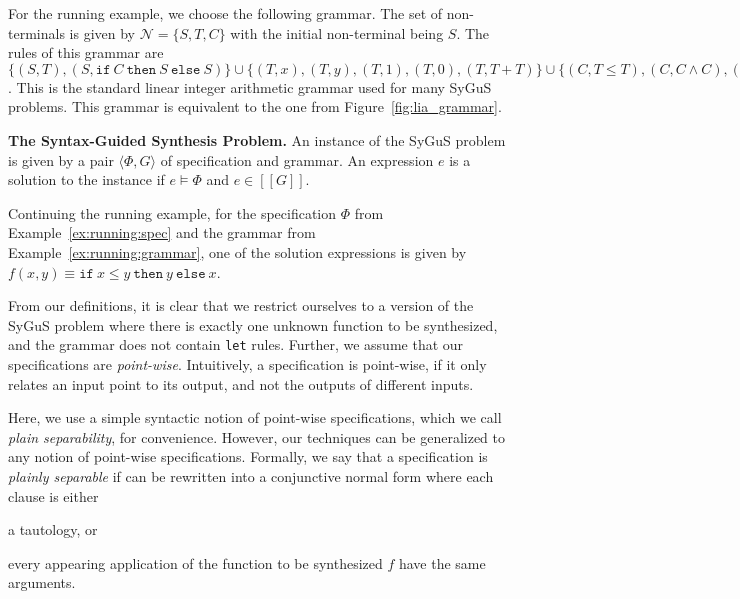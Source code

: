 \documentclass{llncs}
\newcommand\tuple[1]{\langle #1 \rangle}
\newcommand\Expr{e}
\newcommand\Spec{\Phi}
\newcommand\Grammar{G}
\newcommand\sem[1]{[\![ #1 ]\!]}
\newcommand\SynthFun{f}
\newcommand\NonTerminals{\mathcal{N}}
\newcommand\StartSymbol{S}
\newcommand\ITE[3]{\mathtt{if}~#1~\mathtt{then}~#2~\mathtt{else}~#3}
\newcommand{\sygus}{{\sffamily\fontsize{8.5}{10}\selectfont
    SyGuS}\xspace}
\renewcommand{\paragraph}[1]{\par\noindent\textbf{#1.}}
\begin{document}
\begin{example}
  \label{ex:running:grammar}
  For the running example, we choose the following grammar.
  The set of non-terminals is given by $\NonTerminals = \{ \StartSymbol, T, C \}$ with
  the initial non-terminal being $\StartSymbol$.
  The rules of this grammar are $\{ (\StartSymbol, T), (\StartSymbol,
      \ITE{C}{\StartSymbol}{\StartSymbol})
    \} \cup \{ (T, x), (T, y), (T, 1), (T, 0), (T, T + T) \} \cup
        \{ (C, T \leq T), (C, C \wedge C), (C, \neg C) \}$.
  This is the standard linear integer arithmetic grammar used for many
  \sygus problems.
  This grammar is equivalent to the one from
  Figure~\ref{fig:lia_grammar}.
\end{example}

\paragraph{The Syntax-Guided Synthesis Problem}
An instance of the \sygus problem is given by a pair $\tuple { \Spec,
\Grammar }$ of specification and grammar.
An expression $\Expr$ is a solution to the instance if $\Expr \models
\Spec$ and $\Expr \in \sem{\Grammar}$.

\begin{example}
  Continuing the running example, for the specification $\Spec$ from
  Example~\ref{ex:running:spec} and the grammar from
  Example~\ref{ex:running:grammar}, one of the solution expressions is
  given by $\SynthFun(x, y) \equiv \ITE{x \leq y}{y}{x}$.
\end{example}

From our definitions, it is clear that we restrict ourselves to a
version of the \sygus problem where there is exactly one unknown function
to be synthesized, and the grammar does not contain {\tt let} rules.
Further, we assume that our specifications are \emph{point-wise}.
Intuitively, a specification is point-wise, if it only relates an
input point to its output, and not the outputs of different inputs.

Here, we use a simple syntactic notion of point-wise specifications,
which we call \emph{plain separability}, for convenience.
However, our techniques can be generalized to any notion of point-wise
specifications.
Formally, we say that a specification is {\em plainly separable} if can
be rewritten into a conjunctive normal form where each clause is either
\begin{inparaenum}[(a)]
\item a tautology, or
\item every appearing application of the function to be synthesized
  $\SynthFun$ have the same arguments.
\end{inparaenum}
\end{document}
